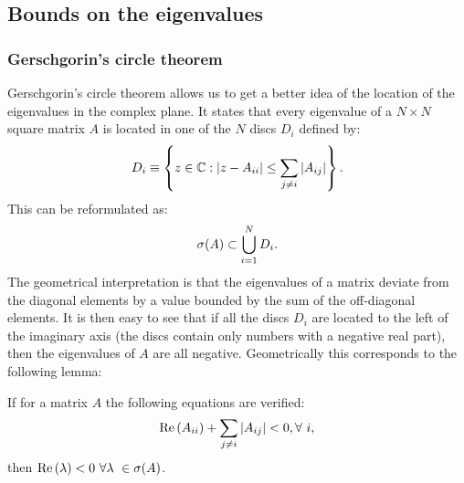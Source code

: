 \documentclass[12pt, titlepage]{report}
\begin{document}
\subsection{Bounds on the eigenvalues}
\subsubsection{Gerschgorin's circle theorem}
Gerschgorin's circle theorem \cite{gerschgorin_uber_1931} allows us to get a better idea of the location of the eigenvalues in the complex plane. It states that every eigenvalue of a $N\times N$ square matrix $A$
is located in one of the $N$ discs $D_i$ defined by:
\begin{equation}
D_i\equiv \left\{z \in \mathbb{C}: \left|{z-A_{ii}}\right| \leq \sum_{j\neq i} \left|{A_{ij}}\right| \right\}. \label{eq: definition discs Gerschgorin}
\end{equation}
This can be reformulated as:
\begin{equation}
\sigma(A) \subset \bigcup_{i=1}^N D_i. \label{eq: circle theorem}
\end{equation}
The geometrical interpretation is that the eigenvalues of a matrix deviate from the diagonal elements by a value bounded by the sum of the off-diagonal elements.
It is then easy to see that if all the discs $D_i$ are located to the left of the imaginary axis (\ie the discs contain only numbers with a negative real part), then the eigenvalues of $A$ are all negative. Geometrically this corresponds to the following lemma:
\begin{lemma}\label{lemma: lemma Gerschgorin circle}
If for a matrix $A$ the following equations are verified:
\begin{equation}
\text{Re}\left(A_{ii}\right) + \sum_{j\neq i} \left|{A_{ij}}\right| < 0, \forall \ i, \label{eq: alternative version circle theorem}
\end{equation}
then $\real{\lambda} < 0 \ \forall \lambda \in \sigma(A)$.
\end{lemma}
\end{document}
